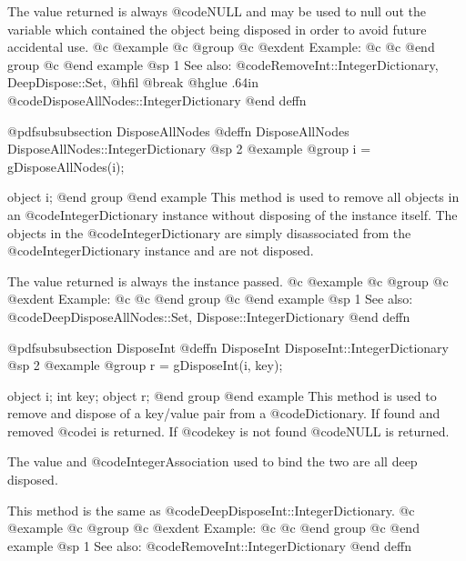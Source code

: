 The value returned is always @code{NULL} and may be used to null out
the variable which contained the object being disposed in order to
avoid future accidental use.
@c @example
@c @group
@c @exdent Example:
@c 
@c @end group
@c @end example
@sp 1
See also:  @code{RemoveInt::IntegerDictionary, DeepDispose::Set,}
@hfil @break @hglue .64in      @code{DisposeAllNodes::IntegerDictionary}
@end deffn













@pdfsubsubsection {DisposeAllNodes}
@deffn {DisposeAllNodes} DisposeAllNodes::IntegerDictionary
@sp 2
@example
@group
i = gDisposeAllNodes(i);

object  i;
@end group
@end example
This method is used to remove all objects in an @code{IntegerDictionary}
instance without disposing of the instance itself.  The objects in the
@code{IntegerDictionary} are simply disassociated from the
@code{IntegerDictionary} instance and are not disposed.

The value returned is always the instance passed.
@c @example
@c @group
@c @exdent Example:
@c 
@c @end group
@c @end example
@sp 1
See also:  @code{DeepDisposeAllNodes::Set, Dispose::IntegerDictionary}
@end deffn




















@pdfsubsubsection {DisposeInt}
@deffn {DisposeInt} DisposeInt::IntegerDictionary
@sp 2
@example
@group
r = gDisposeInt(i, key);

object  i;
int     key;
object  r;
@end group
@end example
This method is used to remove and dispose of a key/value pair from a
@code{Dictionary}.  If found and removed @code{i} is returned.  If @code{key}
is not found @code{NULL} is returned.

The value and @code{IntegerAssociation} used to bind the two are all deep
disposed.

This method is the same as @code{DeepDisposeInt::IntegerDictionary}.
@c @example
@c @group
@c @exdent Example:
@c 
@c @end group
@c @end example
@sp 1
See also:  @code{RemoveInt::IntegerDictionary}
@end deffn














